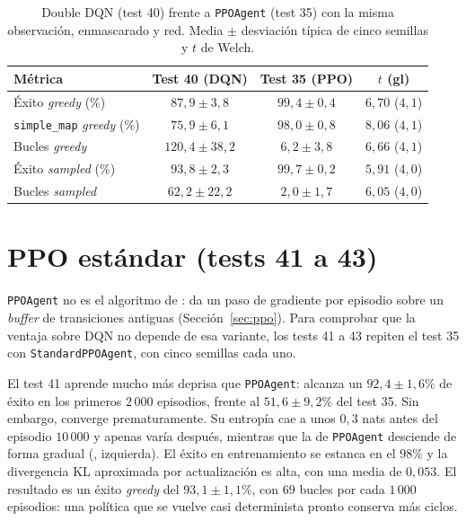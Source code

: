 \begin{table}[htbp]
    \centering
    \caption[DQN frente a PPOAgent con la misma observación]{Double DQN
    (test 40) frente a \texttt{PPOAgent} (test 35) con la misma
    observación, enmascarado y red. Media $\pm$ desviación típica de cinco
    semillas y $t$ de Welch.}
    \label{tab:res_dqn}
    \begin{tabular}{lccc}
        \toprule
        \textbf{Métrica} & \textbf{Test 40 (DQN)} & \textbf{Test 35 (PPO)} & \textbf{$t$ (gl)} \\
        \midrule
        Éxito \textit{greedy} (\%) & $87{,}9 \pm 3{,}8$ & $99{,}4 \pm 0{,}4$ & $6{,}70$ ($4{,}1$) \\
        \texttt{simple\_map} \textit{greedy} (\%) & $75{,}9 \pm 6{,}1$ & $98{,}0 \pm 0{,}8$ & $8{,}06$ ($4{,}1$) \\
        Bucles \textit{greedy} & $120{,}4 \pm 38{,}2$ & $6{,}2 \pm 3{,}8$ & $6{,}66$ ($4{,}1$) \\
        Éxito \textit{sampled} (\%) & $93{,}8 \pm 2{,}3$ & $99{,}7 \pm 0{,}2$ & $5{,}91$ ($4{,}0$) \\
        Bucles \textit{sampled} & $62{,}2 \pm 22{,}2$ & $2{,}0 \pm 1{,}7$ & $6{,}05$ ($4{,}0$) \\
        \bottomrule
    \end{tabular}
\end{table}

\section{PPO estándar (tests 41 a 43)}\label{sec:res_ppo_estandar}
\texttt{PPOAgent} no es el algoritmo de \citet{schulman2017proximal}: da
un paso de gradiente por episodio sobre un \textit{buffer} de transiciones
antiguas (Sección~\ref{sec:ppo}). Para comprobar que la ventaja sobre DQN
no depende de esa variante, los tests 41 a 43 repiten el test 35 con
\texttt{StandardPPOAgent}, con cinco semillas cada uno.

El test 41 aprende mucho más deprisa que \texttt{PPOAgent}: alcanza un
$92{,}4 \pm 1{,}6\%$ de éxito en los primeros $2\,000$ episodios, frente
al $51{,}6 \pm 9{,}2\%$ del test 35. Sin embargo, converge
prematuramente. Su entropía cae a unos $0{,}3$ nats antes del episodio
$10\,000$ y apenas varía después, mientras que la de \texttt{PPOAgent}
desciende de forma gradual (, izquierda). El éxito
en entrenamiento se estanca en el $98\%$ y la divergencia KL aproximada
por actualización es alta, con una media de $0{,}053$. El resultado es un
éxito \textit{greedy} del $93{,}1 \pm 1{,}1\%$, con $69$ bucles por cada
$1\,000$ episodios: una política que se vuelve casi determinista pronto
conserva más ciclos.

